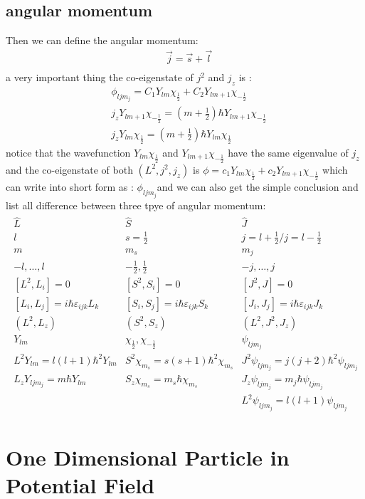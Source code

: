 \documentclass{article}
\begin{document}
\subsection{angular momentum}
Then we can define the angular momentum:
\begin{align}
&\vec j=\vec s+\vec l\\
\end{align}
a very important thing the co-eigenstate of $j^2$ and $j_z$ is :
\begin{align}
&\phi_{ljm_j}=C_1Y_{lm}\chi_{\frac12}+C_2Y_{lm+1}\chi_{-\frac12}\\
&j_zY_{lm+1}\chi_{-\frac12}=(m+\frac12)\hbar Y_{lm+1}\chi_{-\frac12}\\
&j_zY_{lm}\chi_{\frac12}=(m+\frac12)\hbar Y_{lm}\chi_{\frac12}
\end{align}
notice that the wavefunction $Y_{lm}\chi_{\frac12}$ and $Y_{lm+1}\chi_{-\frac12}$ have the same eigenvalue of $j_z$ and the co-eigenstate of both $(L^2,j^2,j_z)$ is $\phi=c_1Y_{lm}\chi_{\frac12}+c_2Y_{lm+1}\chi_{-\frac12} $ which can write into short form as : $\phi_{ljm_j}$and we can also get the simple conclusion and list all difference between three tpye of angular momentum:
\newpage
\begin{align*}
  \begin{matrix}
    \hat L & \hat S & \hat J\\
    l&s=\frac12&j=l+\frac12/j=l-\frac12\\
    m&m_s&m_j\\
    -l,\dots,l&-\frac12,\frac12&-j,\dots,j\\
    [L^2,L_i]=0&[S^2,S_i]=0&[J^2,J]=0\\
    [L_i,L_j]=i\hbar\varepsilon_{ijk}L_k&[S_i,S_j]=i\hbar\varepsilon_{ijk}S_k&[J_i,J_j]=i\hbar\varepsilon_{ijk}J_k\\
    (L^2,L_z)&(S^2,S_z)&(L^2,J^2,J_z)\\
    Y_{lm}&\chi_{\frac12},\chi_{-\frac12}&\psi_{ljm_j}\\
    L^2Y_{lm}=l(l+1)\hbar^2Y_{lm}&S^2\chi_{m_s}=s(s+1)\hbar^2\chi_{m_s}&J^2\psi_{ljm_j}=j(j+2)\hbar^2\psi_{ljm_j}\\
    L_zY_{ljm_j}=m\hbar Y_{lm}&S_z\chi_{m_s}=m_s\hbar\chi_{m_s}&J_z\psi_{ljm_j}=m_j\hbar\psi_{ljm_j}\\
                              &&L^2\psi_{ljm_j}=l(l+1)\psi_{ljm_j}
  \end{matrix}
\end{align*}

\section{One Dimensional Particle in Potential Field}
\end{document}
